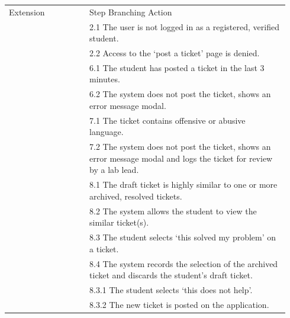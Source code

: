 \documentclass[a4paper,11pt]{article}
\begin{document}
\begin{table}[H]
\begin{tabular}{p{0.27\linewidth}  p{0.67\linewidth}}
 Extension & Step\hspace{0.3cm} Branching Action \\
 & 2.1 \hspace{0.5cm}The user is not logged in as a registered, verified student. \\
 & 2.2 \hspace{0.5cm}Access to the `post a ticket' page is denied. \\
 & 6.1 \hspace{0.5cm}The student has posted a ticket in the last 3 minutes. \\
 & 6.2 \hspace{0.5cm}The system does not post the ticket, shows an error message modal. \\
 & 7.1 \hspace{0.5cm} The ticket contains offensive or abusive language.\\
 & 7.2 \hspace{0.5cm} The system does not post the ticket, shows an error message modal and logs the ticket for review by a lab lead.\\
 & 8.1 \hspace{0.5cm} The draft ticket is highly similar to one or more archived, resolved tickets.\\
 & 8.2 \hspace{0.5cm} The system allows the student to view the similar ticket(s).\\
 & 8.3 \hspace{0.5cm} The student selects `this solved my problem' on a ticket.\\
 & 8.4 \hspace{0.5cm} The system records the selection of the archived ticket and discards the student's draft ticket.\\
 & 8.3.1 \hspace{0.5cm} The student selects `this does not help'.\\
 & 8.3.2 \hspace{0.5cm} The new ticket is posted on the application.\\
 
\end{tabular}
\end{table}

\newpage
\end{document}
